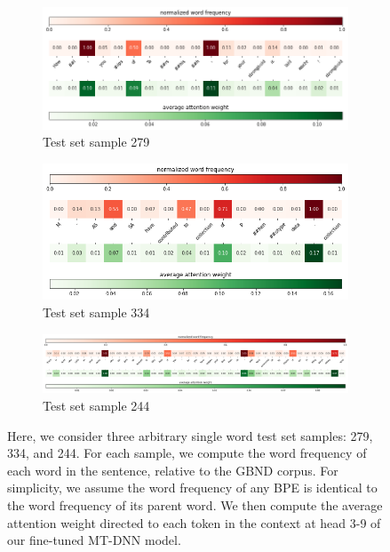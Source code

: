 \documentclass{dcthesis}
\theoremstyle{definition}
\theoremstyle{remark}
\begin{document}
\begin{figure}
  \centering
  \begin{subfigure}[b]{0.9\textwidth}
     \includegraphics[width=1\linewidth]{head_3-9_tf_avg_1.png}
     \caption{Test set sample 279}
     \label{fig:head_3-9_tf_avg_1} 
  \end{subfigure}\vspace{10mm}
  
  \begin{subfigure}[b]{0.9\textwidth}
     \includegraphics[width=1\linewidth]{head_3-9_tf_avg_2.png}
     \caption{Test set sample 334}
     \label{fig:head_3-9_tf_avg_2}
  \end{subfigure}\vspace{10mm}

  \begin{subfigure}[b]{0.95\textwidth}
    \includegraphics[width=1\linewidth]{head_3-9_tf_avg_3.png}
    \caption{Test set sample 244}
    \label{fig:head_3-9_tf_avg_3}
  \end{subfigure}

 \caption{\label{fig:head_3-9_tf_avg} Here, we consider three arbitrary single word test set samples: 279, 334, and 244. For each sample, we compute the word frequency of each word in the sentence, relative to the GBND corpus. For simplicity, we assume the word frequency of any BPE is identical to the word frequency of its parent word. We then compute the average attention weight directed to each token in the context at head 3-9 of our fine-tuned MT-DNN model.}
\end{figure}
\end{document}
